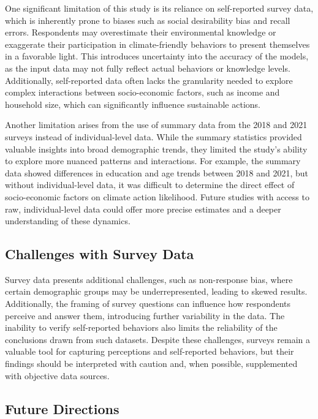 \documentclass[
  letterpaper,
  DIV=11,
  numbers=noendperiod]{scrartcl}
\begin{document}
One significant limitation of this study is its reliance on
self-reported survey data, which is inherently prone to biases such as
social desirability bias and recall errors. Respondents may overestimate
their environmental knowledge or exaggerate their participation in
climate-friendly behaviors to present themselves in a favorable light.
This introduces uncertainty into the accuracy of the models, as the
input data may not fully reflect actual behaviors or knowledge levels.
Additionally, self-reported data often lacks the granularity needed to
explore complex interactions between socio-economic factors, such as
income and household size, which can significantly influence sustainable
actions.

Another limitation arises from the use of summary data from the 2018 and
2021 surveys instead of individual-level data. While the summary
statistics provided valuable insights into broad demographic trends,
they limited the study's ability to explore more nuanced patterns and
interactions. For example, the summary data showed differences in
education and age trends between 2018 and 2021, but without
individual-level data, it was difficult to determine the direct effect
of socio-economic factors on climate action likelihood. Future studies
with access to raw, individual-level data could offer more precise
estimates and a deeper understanding of these dynamics.

\subsection{Challenges with Survey
Data}\label{challenges-with-survey-data}

Survey data presents additional challenges, such as non-response bias,
where certain demographic groups may be underrepresented, leading to
skewed results. Additionally, the framing of survey questions can
influence how respondents perceive and answer them, introducing further
variability in the data. The inability to verify self-reported behaviors
also limits the reliability of the conclusions drawn from such datasets.
Despite these challenges, surveys remain a valuable tool for capturing
perceptions and self-reported behaviors, but their findings should be
interpreted with caution and, when possible, supplemented with objective
data sources.

\subsection{Future Directions}\label{future-directions}
\end{document}
